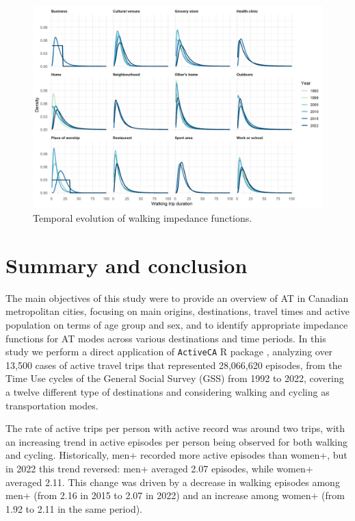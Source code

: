 \documentclass[preprint, 3p,
authoryear]{elsarticle} %
\begin{document}
\begin{figure}

{\centering \includegraphics[width=1\linewidth]{figures/walking_temporal_evolution} 

}

\caption{Temporal evolution of walking impedance functions.}\label{fig:walking-evolution-fig}
\end{figure}

\section{Summary and conclusion}\label{summary-and-conclusion}

The main objectives of this study were to provide an overview of AT in
Canadian metropolitan cities, focusing on main origins, destinations,
travel times and active population on terms of age group and sex, and to
identify appropriate impedance functions for AT modes across various
destinations and time periods. In this study we perform a direct
application of \texttt{ActiveCA} R package \citep{dossantos2025},
analyzing over 13,500 cases of active travel trips that represented
28,066,620 episodes, from the Time Use cycles of the General Social
Survey (GSS) from 1992 to 2022, covering a twelve different type of
destinations and considering walking and cycling as transportation
modes.

The rate of active trips per person with active record was around two
trips, with an increasing trend in active episodes per person being
observed for both walking and cycling. Historically, men+ recorded more
active episodes than women+, but in 2022 this trend reversed: men+
averaged 2.07 episodes, while women+ averaged 2.11. This change was
driven by a decrease in walking episodes among men+ (from 2.16 in 2015
to 2.07 in 2022) and an increase among women+ (from 1.92 to 2.11 in the
same period).
\end{document}
